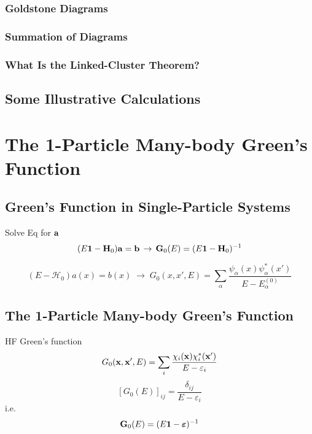 \documentclass[a4paper]{article}
\DeclareMathOperator{\ra}{\rightarrow}
\newcommand{\iden}{{\large \bm{1}}}
\numberwithin{equation}{section}
\begin{document}
\subsubsection{Goldstone Diagrams}

\subsubsection{Summation of Diagrams}

\subsubsection{What Is the Linked-Cluster Theorem?}

\subsection{Some Illustrative Calculations}


\section{The 1-Particle Many-body Green's Function}
\subsection{Green's Function in Single-Particle Systems}
Solve Eq for $ \vb{a} $
\begin{equation}\label{key}
(E\iden - \vb{H}_0) \vb{a} = \vb{b} \;\ra\; \vb{G}_0(E) = (E\iden - \vb{H}_0)^{-1}
\end{equation}

\begin{equation}\label{key}
(E - \mathscr{H}_0)a(x) = b(x) \;\ra\;
G_0(x,x',E) = \sum_\alpha \dfrac{\psi_\alpha(x) \psi_\alpha^*(x')}{E - E_\alpha^{(0)}}
\end{equation}

\subsection{The 1-Particle Many-body Green's Function}
HF Green's function
\begin{equation}\label{key}
G_0(\vb{x}, \vb{x}', E) = \sum_i \dfrac{\chi_i(\vb{x})\chi_i^*(\vb{x}')}{E - \varepsilon_i}
\end{equation}
\begin{equation}\label{key}
[G_0(E)]_{ij} = \dfrac{\delta_{ij}}{E - \varepsilon_i}
\end{equation}
i.e.
\begin{equation}\label{key}
\vb{G}_0(E) = (E\iden - \bm\varepsilon)^{-1}
\end{equation}
\end{document}
